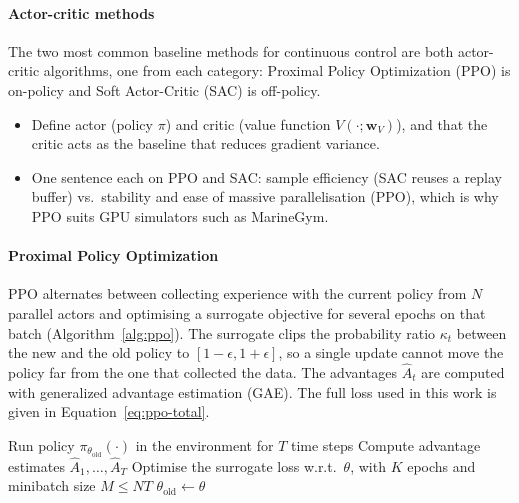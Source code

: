 \paragraph{Actor-critic methods}
The two most common baseline methods for continuous control are both actor-critic algorithms, one from each category: Proximal Policy Optimization (PPO) \parencite{schulman2017ppo} is on-policy and Soft Actor-Critic (SAC) \parencite{haarnoja2018soft} is off-policy.

\begin{itemize}
  \item Define actor (policy $\pi$) and critic (value function $V(\cdot;\mathbf{w}_V)$),
        and that the critic acts as the baseline that reduces gradient variance.
  \item One sentence each on PPO and SAC: sample efficiency (SAC reuses a replay buffer)
        vs.\ stability and ease of massive parallelisation (PPO), which is why PPO
        suits GPU simulators such as MarineGym.
\end{itemize}

\paragraph{Proximal Policy Optimization}
PPO \parencite{schulman2017ppo} alternates between collecting experience with the current policy from $N$ parallel actors and optimising a surrogate objective for several epochs on that batch (Algorithm~\ref{alg:ppo}). The surrogate clips the probability ratio $\kappa_t$ between the new and the old policy to $[1-\epsilon, 1+\epsilon]$, so a single update cannot move the policy far from the one that collected the data. The advantages $\hat A_t$ are computed with generalized advantage estimation (GAE). The full loss used in this work is given in Equation~\eqref{eq:ppo-total}.

\begin{algorithm}[htbp]
\caption{PPO, actor-critic style \parencite{schulman2017ppo}.}
\label{alg:ppo}
\begin{algorithmic}[1]
        \State Run policy $\pi_{\theta_{\mathrm{old}}}(\cdot)$ in the environment for $T$ time steps
        \State Compute advantage estimates $\hat{A}_1, \ldots, \hat{A}_T$
    \EndFor
    \State Optimise the surrogate loss w.r.t.\ $\theta$, with $K$ epochs and minibatch size $M \leq NT$
    \State $\theta_{\mathrm{old}} \leftarrow \theta$
\EndFor
\end{algorithmic}
\end{algorithm}


